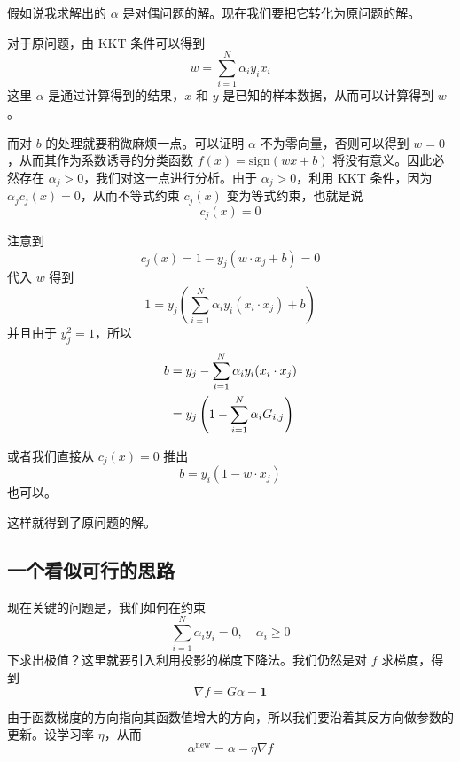 假如说我求解出的 $\alpha$ 是对偶问题的解。现在我们要把它转化为原问题的解。

对于原问题，由 KKT 条件可以得到
\begin{equation}
w = \sum_{i=1}^N \alpha_i y_i x_i
\end{equation}
这里 $\alpha$ 是通过计算得到的结果，$x$ 和 $y$ 是已知的样本数据，从而可以计算得到 $w$。

而对 $b$ 的处理就要稍微麻烦一点。可以证明 $\alpha$ 不为零向量，否则可以得到 $w=0$，从而其作为系数诱导的分类函数 $f(x) = \text{sign}(wx+b)$ 将没有意义。因此必然存在 $\alpha_j > 0$，我们对这一点进行分析。由于 $\alpha_j > 0$，利用 KKT 条件，因为 $\alpha_j c_j(x) = 0$，从而不等式约束 $c_j(x)$ 变为等式约束，也就是说
\begin{equation}
c_j(x) = 0
\end{equation}

注意到
\begin{equation}
c_j(x) = 1 - y_j(w\cdot x_j + b) = 0
\end{equation}
代入 $w$ 得到
\begin{equation}
1 = y_j\left(\sum_{i=1}^N \alpha_i y_i (x_i\cdot x_j) + b\right)
\end{equation}
并且由于 $y_j^2 = 1$，所以
\begin{align}
b &= y_j - \sum_{i=1}^{N}\alpha_i y_i(x_i \cdot x_j) \notag \\
&= y_j\left(1 - \sum_{i=1}^{N} \alpha_i G_{i,j}\right) 
\end{align}

或者我们直接从 $c_j(x)=0$ 推出
\begin{equation}
b = y_i\left( 1 - w\cdot x_j\right)
\end{equation}
也可以。

这样就得到了原问题的解。

\subsection{一个看似可行的思路}

现在关键的问题是，我们如何在约束
\begin{equation}
\sum_{i=1}^{N} \alpha_i y_i = 0, \quad \alpha_i \geqslant 0
\end{equation}
下求出极值？这里就要引入利用投影的梯度下降法。我们仍然是对 $f$ 求梯度，得到
\begin{equation}
\nabla f = G\alpha - \mathbf{1}
\end{equation}

由于函数梯度的方向指向其函数值增大的方向，所以我们要沿着其反方向做参数的更新。设学习率 $\eta$，从而
\begin{equation}
\alpha^{\text{new}} = \alpha - \eta \nabla f
\end{equation}

